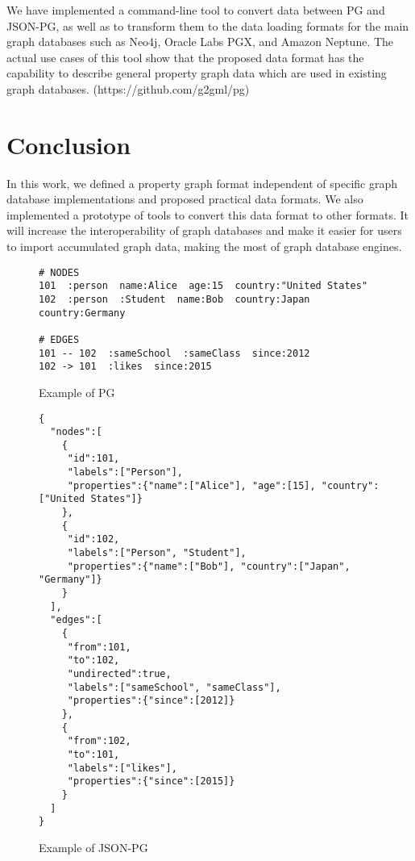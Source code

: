 \documentclass[runningheads]{llncs}
\begin{document}
We have implemented a command-line tool to convert data between PG and JSON-PG, as well as to transform them to the data loading formats for the main graph databases such as Neo4j, Oracle Labs PGX, and Amazon Neptune. The actual use cases of this tool show that the proposed data format has the capability to describe general property graph data which are used in existing graph databases. (https://github.com/g2gml/pg)

\section{Conclusion}
In this work, we defined a property graph format independent of specific graph database implementations and proposed practical data formats. We also implemented a prototype of tools to convert this data format to other formats. 
It will increase the interoperability of graph databases and make it easier for users to import accumulated graph data, making the most of graph database engines.

\begin{figure}[!t]
\begin{scriptsize}
\begin{verbatim}
# NODES
101  :person  name:Alice  age:15  country:"United States"
102  :person  :Student  name:Bob  country:Japan  country:Germany

# EDGES
101 -- 102  :sameSchool  :sameClass  since:2012
102 -> 101  :likes  since:2015
\end{verbatim}
\end{scriptsize}
\caption{Example of PG}
\label{fig:example-pg}
\end{figure}

\begin{figure}[!t]
\begin{scriptsize}
\begin{verbatim}
{
  "nodes":[
    {
     "id":101,
     "labels":["Person"],
     "properties":{"name":["Alice"], "age":[15], "country":["United States"]}
    },
    {
     "id":102,
     "labels":["Person", "Student"],
     "properties":{"name":["Bob"], "country":["Japan", "Germany"]}
    }
  ],
  "edges":[
    {
     "from":101,
     "to":102,
     "undirected":true,
     "labels":["sameSchool", "sameClass"],
     "properties":{"since":[2012]}
    },
    {
     "from":102,
     "to":101,
     "labels":["likes"],
     "properties":{"since":[2015]}
    }
  ]
}
\end{verbatim}
\end{scriptsize}
\caption{Example of JSON-PG}
\label{fig:example-json}
\end{figure}
\end{document}
